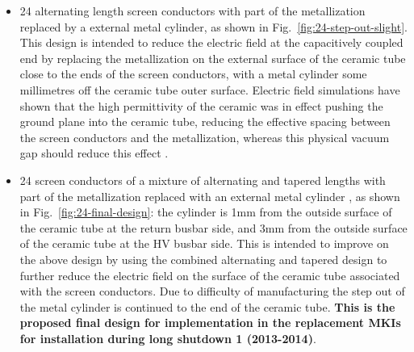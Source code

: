 \begin{itemize}
\item{24 alternating length screen conductors with part of the metallization replaced by a external metal cylinder, as shown in Fig.~\ref{fig:24-step-out-slight}. This design is intended to reduce the electric field at the capacitively coupled end by replacing the metallization on the external surface of the ceramic tube close to the ends of the screen conductors, with a metal cylinder some millimetres off the ceramic tube outer surface. Electric field simulations have shown that the high permittivity of the ceramic was in effect pushing the ground plane into the ceramic tube, reducing the effective spacing between the screen conductors and the metallization, whereas this physical vacuum gap should reduce this effect \cite{Barnes:mkiAlt}.}
\item{24 screen conductors of a mixture of alternating and tapered lengths with part of the metallization replaced with an external metal cylinder \cite{Barnes:mkiElecSurfCer}, as shown in Fig.~\ref{fig:24-final-design}: the cylinder is 1mm from the outside surface of the ceramic tube at the return busbar side, and 3mm from the outside surface of the ceramic tube at the HV busbar side. This is intended to improve on the above design by using the combined alternating and tapered design to further reduce the electric field on the surface of the ceramic tube associated with the screen conductors. Due to difficulty of manufacturing the step out of the metal cylinder is continued to the end of the ceramic tube. \textbf{This is the proposed final design for implementation in the replacement MKIs for installation during long shutdown 1 (2013-2014)}.}
\end{itemize}

